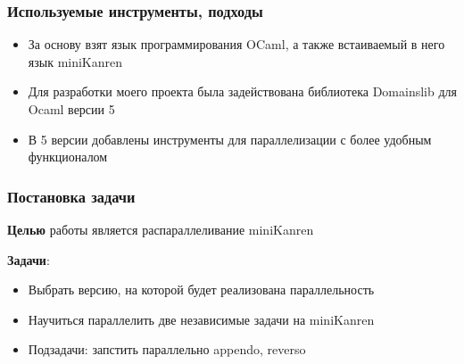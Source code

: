 \documentclass{beamer}
\begin{document}
\begin{frame}
  \frametitle{Используемые инструменты, подходы}
  \begin{itemize}
    \item За основу взят язык программирования OCaml, а также встаиваемый в него язык miniKanren
    \item Для разработки моего проекта была задействована библиотека Domainslib для Ocaml версии 5
    \item В 5 версии добавлены инструменты для параллелизации с более удобным функционалом
  \end{itemize}

\end{frame}



\begin{frame}
  \frametitle{Постановка задачи}
  \textbf{Целью} работы является распараллеливание miniKanren %

  \textbf{Задачи}:
  \begin{itemize}
    \item Выбрать версию, на которой будет реализована параллельность 
    \item Научиться параллелить две независимые задачи на miniKanren
    \item Подзадачи: запстить параллельно appendo, reverso
  \end{itemize}
\end{frame}
\end{document}
